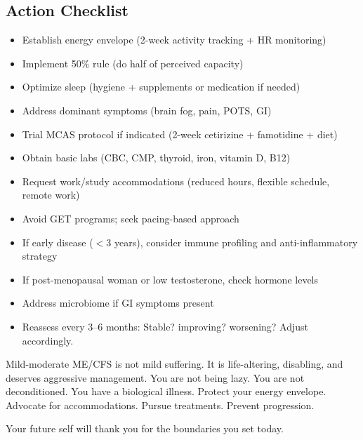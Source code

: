 \subsection{Action Checklist}

\begin{itemize}
    \item[$\square$] Establish energy envelope (2-week activity tracking + HR monitoring)
    \item[$\square$] Implement 50\% rule (do half of perceived capacity)
    \item[$\square$] Optimize sleep (hygiene + supplements or medication if needed)
    \item[$\square$] Address dominant symptoms (brain fog, pain, POTS, GI)
    \item[$\square$] Trial MCAS protocol if indicated (2-week cetirizine + famotidine + diet)
    \item[$\square$] Obtain basic labs (CBC, CMP, thyroid, iron, vitamin D, B12)
    \item[$\square$] Request work/study accommodations (reduced hours, flexible schedule, remote work)
    \item[$\square$] Avoid GET programs; seek pacing-based approach
    \item[$\square$] If early disease ($<$3 years), consider immune profiling and anti-inflammatory strategy
    \item[$\square$] If post-menopausal woman or low testosterone, check hormone levels
    \item[$\square$] Address microbiome if GI symptoms present
    \item[$\square$] Reassess every 3--6 months: Stable? improving? worsening? Adjust accordingly.
\end{itemize}

Mild-moderate ME/CFS is not mild suffering. It is life-altering, disabling, and deserves aggressive management. You are not being lazy. You are not deconditioned. You have a biological illness. Protect your energy envelope. Advocate for accommodations. Pursue treatments. Prevent progression.

Your future self will thank you for the boundaries you set today.

